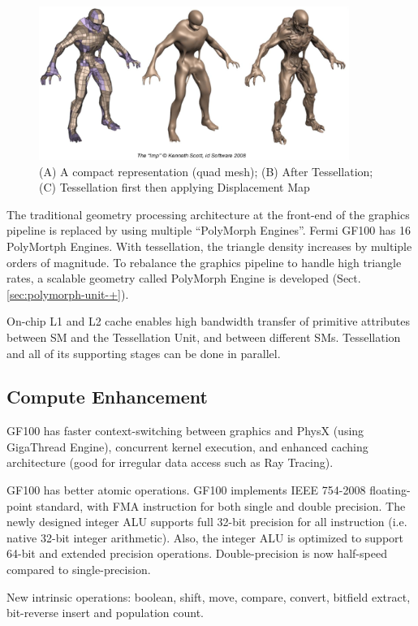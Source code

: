 \begin{figure}[hbt]
  \centerline{\includegraphics[height=5cm,
    angle=0]{./images/Ex_Tessellation.eps}}
  \caption{(A) A compact representation (quad mesh); (B) After Tessellation;
  (C) Tessellation first then applying Displacement Map}
  \label{fig:Ex_Tessellation}
\end{figure}


The traditional geometry processing architecture at the front-end of the
graphics pipeline is replaced by using multiple ``PolyMorph Engines''. Fermi
GF100 has 16 PolyMortph Engines. With tessellation, the triangle density
increases by multiple orders of magnitude. To rebalance the graphics pipeline to
handle high triangle rates, a scalable geometry called PolyMorph Engine is
developed (Sect.\ref{sec:polymorph-unit-+}).

On-chip L1 and L2 cache enables high bandwidth transfer of primitive attributes
between SM and the Tessellation Unit, and between different SMs. Tessellation
and all of its supporting stages can be done in parallel.

\subsection{Compute Enhancement}

GF100 has faster context-switching between graphics and PhysX (using GigaThread
Engine), concurrent kernel execution, and enhanced caching architecture (good
for irregular data access such as Ray Tracing).

GF100 has better atomic operations. GF100 implements IEEE 754-2008
floating-point standard, with FMA instruction for both single and double
precision. The newly designed integer ALU supports full 32-bit precision for all
instruction (i.e. native 32-bit integer arithmetic). Also, the integer ALU is
optimized to support 64-bit and extended precision operations. Double-precision
is now half-speed compared to single-precision.

New intrinsic operations: boolean, shift, move, compare, convert, bitfield
extract, bit-reverse insert and population count.

